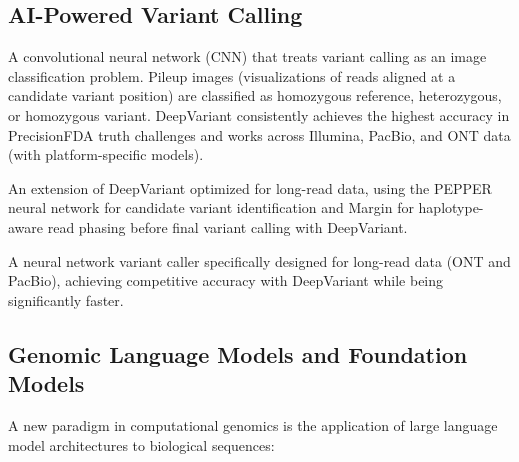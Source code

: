 \subsection{AI-Powered Variant Calling}
\label{subsec:emerging:ai-variant-calling}

\begin{description}[style=nextline, itemsep=3pt]
  \item[DeepVariant (Google)] A convolutional neural network (CNN) that treats variant calling as an image classification problem. Pileup images (visualizations of reads aligned at a candidate variant position) are classified as homozygous reference, heterozygous, or homozygous variant. DeepVariant consistently achieves the highest accuracy in PrecisionFDA truth challenges and works across Illumina, PacBio, and ONT data (with platform-specific models).

  \item[PEPPER-Margin-DeepVariant] An extension of DeepVariant optimized for long-read data, using the PEPPER neural network for candidate variant identification and Margin for haplotype-aware read phasing before final variant calling with DeepVariant.

  \item[Clair3] A neural network variant caller specifically designed for long-read data (ONT and PacBio), achieving competitive accuracy with DeepVariant while being significantly faster.
\end{description}

\subsection{Genomic Language Models and Foundation Models}
\label{subsec:emerging:foundation-models}

A new paradigm in computational genomics is the application of large language model architectures to biological sequences:


